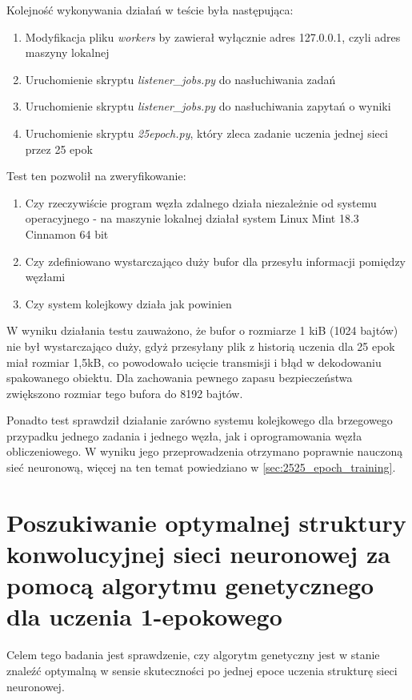 Kolejność wykonywania działań w teście była następująca:

\begin{enumerate}
  \item Modyfikacja pliku \textit{workers} by zawierał wyłącznie adres 127.0.0.1, czyli adres maszyny lokalnej
  \item Uruchomienie skryptu \textit{listener\_jobs.py} do nasłuchiwania zadań
  \item Uruchomienie skryptu \textit{listener\_jobs.py} do nasłuchiwania zapytań o wyniki
  \item Uruchomienie skryptu \textit{25epoch.py}, który zleca zadanie uczenia jednej sieci przez 25 epok
\end{enumerate}

Test ten pozwolił na zweryfikowanie:
\begin{enumerate}
  \item Czy rzeczywiście program węzła zdalnego działa niezależnie od systemu operacyjnego - na maszynie lokalnej działał system Linux Mint 18.3 Cinnamon 64 bit
  \item Czy zdefiniowano wystarczająco duży bufor dla przesyłu informacji pomiędzy węzłami
  \item Czy system kolejkowy działa jak powinien
\end{enumerate}

W wyniku działania testu zauważono, że bufor o rozmiarze 1 kiB (1024 bajtów) nie był wystarczająco duży, gdyż przesyłany plik z historią uczenia dla 25 epok miał rozmiar 1,5kB, co powodowało ucięcie transmisji i błąd w dekodowaniu spakowanego obiektu.
Dla zachowania pewnego zapasu bezpieczeństwa zwiększono rozmiar tego bufora do 8192 bajtów.

Ponadto test sprawdził działanie zarówno systemu kolejkowego dla brzegowego przypadku jednego zadania i jednego węzła, jak i oprogramowania węzła obliczeniowego.
W wyniku jego przeprowadzenia otrzymano poprawnie nauczoną sieć neuronową, więcej na ten temat powiedziano w \ref{sec:2525_epoch_training}.

\section{Poszukiwanie optymalnej struktury konwolucyjnej sieci neuronowej za pomocą algorytmu genetycznego dla uczenia 1-epokowego}\label{sec:actual_experiment}
Celem tego badania jest sprawdzenie, czy algorytm genetyczny jest w stanie znaleźć optymalną w sensie skuteczności po jednej epoce uczenia strukturę sieci neuronowej.

